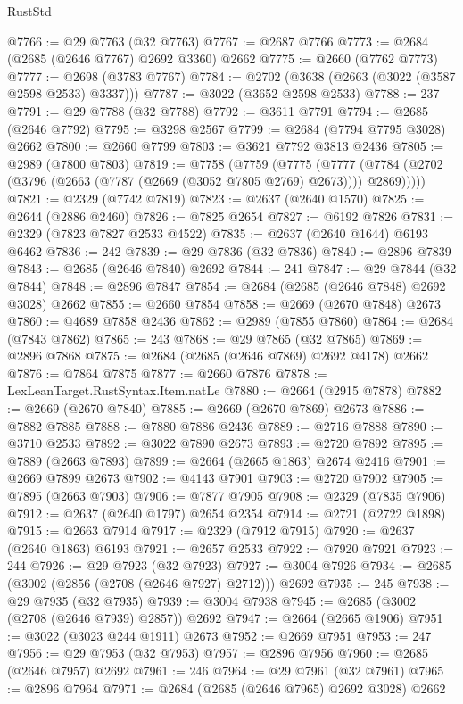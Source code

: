 \begin{lexlean}{RustStd}
\begin{coremodule}
@7766 := @29 @7763 (@32 @7763)
@7767 := @2687 @7766
@7773 := @2684 (@2685 (@2646 @7767) @2692 @3360) @2662
@7775 := @2660 (@7762 @7773)
@7777 := @2698 (@3783 @7767)
@7784 := @2702 (@3638 (@2663 (@3022 (@3587 @2598 @2533) @3337)))
@7787 := @3022 (@3652 @2598 @2533)
@7788 := 237
@7791 := @29 @7788 (@32 @7788)
@7792 := @3611 @7791
@7794 := @2685 (@2646 @7792)
@7795 := @3298 @2567
@7799 := @2684 (@7794 @7795 @3028) @2662
@7800 := @2660 @7799
@7803 := @3621 @7792 @3813 @2436
@7805 := @2989 (@7800 @7803)
@7819 := @7758
    (@7759
      (@7775
        (@7777 (@7784 (@2702 (@3796 (@2663 (@7787 (@2669 (@3052 @7805 @2769) @2673)))) @2869)))))
@7821 := @2329 (@7742 @7819)
@7823 := @2637 (@2640 @1570)
@7825 := @2644 (@2886 @2460)
@7826 := @7825 @2654
@7827 := @6192 @7826
@7831 := @2329 (@7823 @7827 @2533 @4522)
@7835 := @2637 (@2640 @1644) @6193 @6462
@7836 := 242
@7839 := @29 @7836 (@32 @7836)
@7840 := @2896 @7839
@7843 := @2685 (@2646 @7840) @2692
@7844 := 241
@7847 := @29 @7844 (@32 @7844)
@7848 := @2896 @7847
@7854 := @2684 (@2685 (@2646 @7848) @2692 @3028) @2662
@7855 := @2660 @7854
@7858 := @2669 (@2670 @7848) @2673
@7860 := @4689 @7858 @2436
@7862 := @2989 (@7855 @7860)
@7864 := @2684 (@7843 @7862)
@7865 := 243
@7868 := @29 @7865 (@32 @7865)
@7869 := @2896 @7868
@7875 := @2684 (@2685 (@2646 @7869) @2692 @4178) @2662
@7876 := @7864 @7875
@7877 := @2660 @7876
@7878 := LexLeanTarget.RustSyntax.Item.natLe
@7880 := @2664 (@2915 @7878)
@7882 := @2669 (@2670 @7840)
@7885 := @2669 (@2670 @7869) @2673
@7886 := @7882 @7885
@7888 := @7880 @7886 @2436
@7889 := @2716 @7888
@7890 := @3710 @2533
@7892 := @3022 @7890 @2673
@7893 := @2720 @7892
@7895 := @7889 (@2663 @7893)
@7899 := @2664 (@2665 @1863) @2674 @2416
@7901 := @2669 @7899 @2673
@7902 := @4143 @7901
@7903 := @2720 @7902
@7905 := @7895 (@2663 @7903)
@7906 := @7877 @7905
@7908 := @2329 (@7835 @7906)
@7912 := @2637 (@2640 @1797) @2654 @2354
@7914 := @2721 (@2722 @1898)
@7915 := @2663 @7914
@7917 := @2329 (@7912 @7915)
@7920 := @2637 (@2640 @1863) @6193
@7921 := @2657 @2533
@7922 := @7920 @7921
@7923 := 244
@7926 := @29 @7923 (@32 @7923)
@7927 := @3004 @7926
@7934 := @2685 (@3002 (@2856 (@2708 (@2646 @7927) @2712))) @2692
@7935 := 245
@7938 := @29 @7935 (@32 @7935)
@7939 := @3004 @7938
@7945 := @2685 (@3002 (@2708 (@2646 @7939) @2857)) @2692
@7947 := @2664 (@2665 @1906)
@7951 := @3022 (@3023 @244 @1911) @2673
@7952 := @2669 @7951
@7953 := 247
@7956 := @29 @7953 (@32 @7953)
@7957 := @2896 @7956
@7960 := @2685 (@2646 @7957) @2692
@7961 := 246
@7964 := @29 @7961 (@32 @7961)
@7965 := @2896 @7964
@7971 := @2684 (@2685 (@2646 @7965) @2692 @3028) @2662

\end{coremodule}
\end{lexlean}
